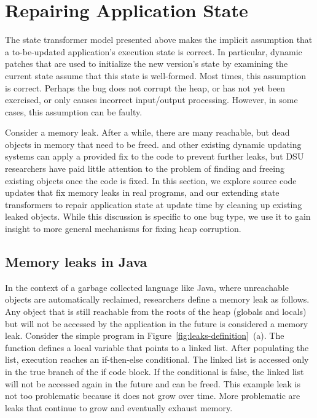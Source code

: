 \section{Repairing Application State}
\label{sec:repair}

The state transformer model presented above makes the
implicit
assumption that a to-be-updated application's execution state is correct.
In particular, dynamic patches that are used to initialize the new
version's state by examining the current state assume that this state is
well-formed.  Most times, this assumption is correct. Perhaps the bug does
not corrupt the heap, or has not yet been exercised, or only
causes incorrect input/output processing. However, in some cases, this
assumption can be faulty.



Consider a memory leak. After a while, there are
many reachable, but dead objects in memory that need to be freed. \JV and other
existing dynamic updating systems can apply a provided fix to the code to prevent
further leaks, but DSU researchers have paid little attention to the problem of finding
and freeing existing objects once the code is fixed. In this section, we
explore source code updates that fix memory leaks in real programs, and our
extending state transformers to repair application state at update time by
cleaning up existing leaked objects.
% 
While this discussion is specific to one bug type, we use it to gain
insight to more general mechanisms for fixing heap corruption.

\subsection{Memory leaks in Java}
In the context of a garbage collected language like Java, where unreachable
objects are automatically reclaimed, researchers define a memory leak as
follows. Any object that is still reachable from the roots of the heap
(globals and locals) but will not be accessed by the application in the
future is considered a memory leak. Consider the
simple program in Figure~\ref{fig:leaks-definition}~(a). The function defines a
local variable that points to a linked list. After populating the list,
execution reaches an if-then-else conditional. The linked list is accessed
only in the true branch of the if code block. If the conditional is
false, the linked list will not be accessed again in the future and
can be freed. This example leak is not too
problematic because it does not grow over time. More problematic are leaks that
continue to grow and eventually exhaust memory.

